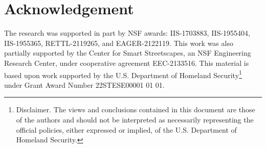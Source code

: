 \vspace{-5pt}
\section*{Acknowledgement} \label{sec:acknowledgment}
\vspace{-3pt}
The research was supported in part by NSF awards: IIS-1703883, IIS-1955404, IIS-1955365, RETTL-2119265, and EAGER-2122119. This work was also partially supported by the Center for Smart Streetscapes, an NSF Engineering Research Center, under cooperative agreement EEC-2133516.
This material is based upon work supported by the U.S. Department of Homeland Security\footnote{Disclaimer. The views and conclusions contained in this document are those of the authors and should not be interpreted as necessarily representing the official policies, either expressed or implied, of the U.S. Department of Homeland Security.} under Grant Award Number 22STESE00001 01 01.
